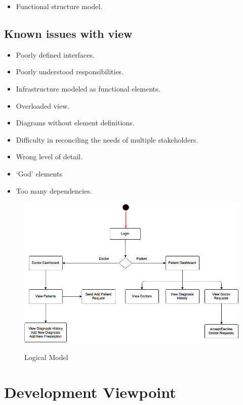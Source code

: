 \begin{itemize}
\item Functional structure model.
\end{itemize}

\subsection{Known issues with view}

\begin{itemize}
\item Poorly defined interfaces.
\item Poorly understood responsibilities. 
\item Infrastructure modeled as functional elements.
\item Overloaded view.
\item Diagrams without element definitions. 
\item Difficulty in reconciling the needs of multiple stakeholders.
\item Wrong level of detail.
\item `God’ elements
\item Too many dependencies.
\end{itemize}

\FloatBarrier

\begin{figure}[h!]
\centering
\caption{Logical Model}
\includegraphics[width=16cm]{Logical.png}
\label{Basic Micro-services architecture pattern}
\end{figure}

\FloatBarrier

\section{Development Viewpoint}

